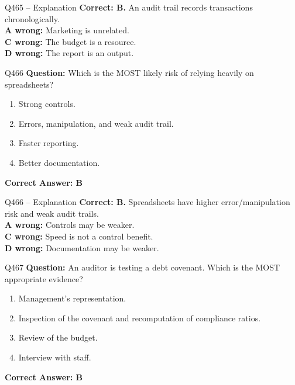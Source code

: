 \documentclass[aspectratio=169,10pt]{beamer}
\begin{document}
	\begin{frame}[t]{Q465 -- Explanation}
		\small
		\textbf{Correct: B.} An audit trail records transactions chronologically. \\[4pt]
		\textbf{A wrong:} Marketing is unrelated. \\[2pt]
		\textbf{C wrong:} The budget is a resource. \\[2pt]
		\textbf{D wrong:} The report is an output.
	\end{frame}
	
	\begin{frame}[t]{Q466}
		\small
		\textbf{Question:} Which is the MOST likely risk of relying heavily on spreadsheets?
		\begin{enumerate}[label=\Alph*.,itemsep=1pt,topsep=2pt]
			\item Strong controls.
			\item Errors, manipulation, and weak audit trail.
			\item Faster reporting.
			\item Better documentation.
		\end{enumerate}
		\vspace{4pt}
		\textbf{Correct Answer: B}
	\end{frame}
	
	\begin{frame}[t]{Q466 -- Explanation}
		\small
		\textbf{Correct: B.} Spreadsheets have higher error/manipulation risk and weak audit trails. \\[4pt]
		\textbf{A wrong:} Controls may be weaker. \\[2pt]
		\textbf{C wrong:} Speed is not a control benefit. \\[2pt]
		\textbf{D wrong:} Documentation may be weaker.
	\end{frame}
	
	\begin{frame}[t]{Q467}
		\small
		\textbf{Question:} An auditor is testing a debt covenant. Which is the MOST appropriate evidence?
		\begin{enumerate}[label=\Alph*.,itemsep=1pt,topsep=2pt]
			\item Management's representation.
			\item Inspection of the covenant and recomputation of compliance ratios.
			\item Review of the budget.
			\item Interview with staff.
		\end{enumerate}
		\vspace{4pt}
		\textbf{Correct Answer: B}
	\end{frame}
	
\end{document}
